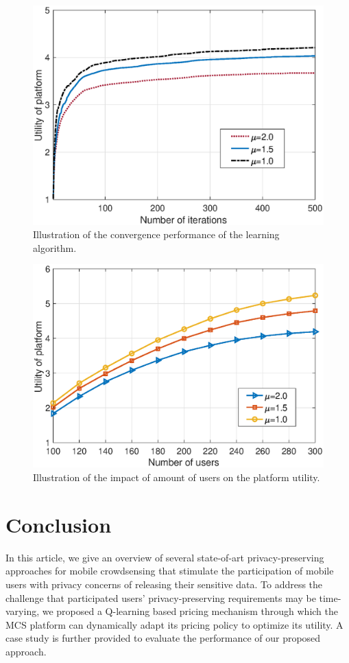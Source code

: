 \begin{figure}[t]
\centering
\includegraphics[scale=0.44]{./pic/conv4.eps}
\caption{Illustration of the convergence performance of the learning algorithm.}\label{conv}
\end{figure}
\begin{figure}[t]
\centering
\includegraphics[scale=0.44]{./pic/u_num4.eps}
\caption{Illustration of the impact of amount of users on the platform utility.}\label{cmax}
\end{figure}


\section{Conclusion}\label{sec:s5}
In this article, we give an overview of several state-of-art privacy-preserving approaches for mobile crowdsensing that stimulate the participation of mobile users with privacy concerns of releasing their sensitive data. To address the challenge that participated users' privacy-preserving requirements may be time-varying, we proposed a Q-learning based pricing mechanism through which the MCS platform can dynamically adapt its pricing policy to optimize its utility. A case study is further provided to evaluate the performance of our proposed approach.

